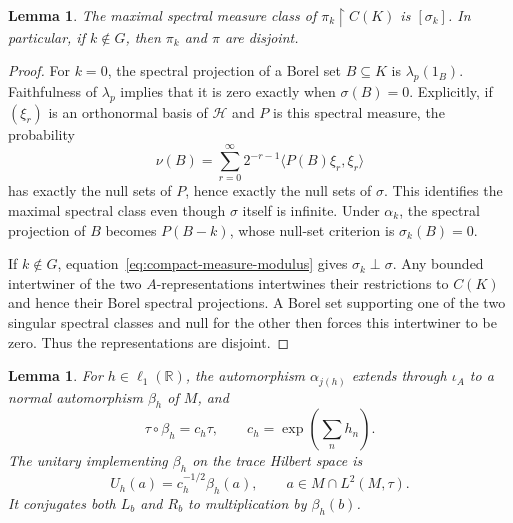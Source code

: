 \documentclass[11pt]{article}
\numberwithin{equation}{section}
\newtheorem{lemma}[theorem]{Lemma}
\theoremstyle{definition}
\newcommand{\R}{\mathbb R}
\begin{document}
\begin{lemma}
\label{lem:diagonal-spectral-class}
The maximal spectral measure class of
$\pi_k\mathbin{\upharpoonright}C(K)$ is $[\sigma_k]$.
In particular, if $k\notin G$, then $\pi_k$ and $\pi$ are disjoint.
\end{lemma}

\begin{proof}
For $k=0$, the spectral projection of a Borel set $B\subseteq K$ is
$\lambda_p(1_B)$. Faithfulness of $\lambda_p$ implies that it is zero
exactly when $\sigma(B)=0$. Explicitly, if $(\xi_r)$ is an orthonormal
basis of $\mathcal H$ and $P$ is this spectral measure, the probability
\[
 \nu(B)=\sum_{r=0}^{\infty}2^{-r-1}\langle P(B)\xi_r,\xi_r\rangle
\]
has exactly the null sets of $P$, hence exactly the null sets of $\sigma$.
This identifies the maximal spectral class even though $\sigma$ itself
is infinite. Under $\alpha_k$, the spectral projection of $B$ becomes
$P(B-k)$, whose null-set criterion is $\sigma_k(B)=0$.

If $k\notin G$, equation~\eqref{eq:compact-measure-modulus} gives
$\sigma_k\perp\sigma$. Any bounded intertwiner of the two
$A$-representations intertwines their restrictions to $C(K)$ and hence
their Borel spectral projections. A Borel set supporting one of the
two singular spectral classes and null for the other then forces this
intertwiner to be zero. Thus the representations are disjoint.
\end{proof}

\begin{lemma}
\label{lem:normal-trace-modulus}
For $h\in\ell_1(\R)$, the automorphism $\alpha_{j(h)}$ extends through
$\iota_A$ to a normal automorphism $\beta_h$ of $M$, and
\begin{equation}
 \tau\circ\beta_h=c_h\tau,
 \qquad c_h=\exp\!\left(\sum_n h_n\right).
 \label{eq:trace-scaling}
\end{equation}
The unitary implementing $\beta_h$ on the trace Hilbert space is
\begin{equation}
 U_h(a)=c_h^{-1/2}\beta_h(a),
 \qquad a\in M\cap L^2(M,\tau).
 \label{eq:explicit-standard-unitary}
\end{equation}
It conjugates both $L_b$ and $R_b$ to multiplication by $\beta_h(b)$.
\end{lemma}
\end{document}
